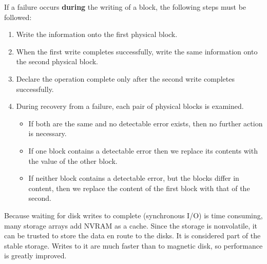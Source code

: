 If a failure occurs \textbf{during} the writing of a block, the following steps must be followed:
\begin{enumerate}[noitemsep]
\item Write the information onto the first physical block.
\item When the first write completes successfully, write the same information onto the second physical block.
\item Declare the operation complete only after the second write completes successfully.
\item During recovery from a failure, each pair of physical blocks is examined.
  \begin{itemize}[noitemsep]
  \item If both are the same and no detectable error exists, then no further action is necessary.
  \item If one block contains a detectable error then we replace its contents with the value of the other block.
  \item If neither block contains a detectable error, but the blocks differ in content, then we replace the content of the first block with that of the second.
  \end{itemize}
\end{enumerate}

Because waiting for disk writes to complete (synchronous I/O) is time consuming, many storage arrays add NVRAM as a cache.
Since the storage is nonvolatile, it can be trusted to store the data en route to the disks.
It is considered part of the stable storage.
Writes to it are much faster than to magnetic disk, so performance is greatly improved.

